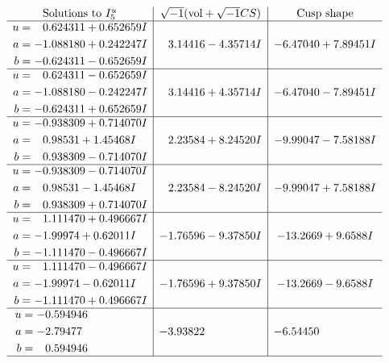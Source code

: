 \documentclass[1p]{elsarticle_modified}
\theoremstyle{definition}
\newcommand{\I}{\sqrt{-1}}
\begin{document}
$$\begin{array}{c|c|c}  
\text{Solutions to }I^u_{5}& \I (\text{vol} + \sqrt{-1}CS) & \text{Cusp shape}\\
 \hline 
\begin{aligned}
u &= \phantom{-}0.624311 + 0.652659 I \\
a &= -1.088180 + 0.242247 I \\
b &= -0.624311 - 0.652659 I\end{aligned}
 & \phantom{-}3.14416 - 4.35714 I & -6.47040 + 7.89451 I \\ \hline\begin{aligned}
u &= \phantom{-}0.624311 - 0.652659 I \\
a &= -1.088180 - 0.242247 I \\
b &= -0.624311 + 0.652659 I\end{aligned}
 & \phantom{-}3.14416 + 4.35714 I & -6.47040 - 7.89451 I \\ \hline\begin{aligned}
u &= -0.938309 + 0.714070 I \\
a &= \phantom{-}0.98531 + 1.45468 I \\
b &= \phantom{-}0.938309 - 0.714070 I\end{aligned}
 & \phantom{-}2.23584 + 8.24520 I & -9.99047 - 7.58188 I \\ \hline\begin{aligned}
u &= -0.938309 - 0.714070 I \\
a &= \phantom{-}0.98531 - 1.45468 I \\
b &= \phantom{-}0.938309 + 0.714070 I\end{aligned}
 & \phantom{-}2.23584 - 8.24520 I & -9.99047 + 7.58188 I \\ \hline\begin{aligned}
u &= \phantom{-}1.111470 + 0.496667 I \\
a &= -1.99974 + 0.62011 I \\
b &= -1.111470 - 0.496667 I\end{aligned}
 & -1.76596 - 9.37850 I & -13.2669 + 9.6588 I \\ \hline\begin{aligned}
u &= \phantom{-}1.111470 - 0.496667 I \\
a &= -1.99974 - 0.62011 I \\
b &= -1.111470 + 0.496667 I\end{aligned}
 & -1.76596 + 9.37850 I & -13.2669 - 9.6588 I \\ \hline\begin{aligned}
u &= -0.594946\phantom{ +0.000000I} \\
a &= -2.79477\phantom{ +0.000000I} \\
b &= \phantom{-}0.594946\phantom{ +0.000000I}\end{aligned}
 & -3.93822\phantom{ +0.000000I} & -6.54450\phantom{ +0.000000I}\\
 \hline 
 \end{array}$$\newpage\newpage\renewcommand{\arraystretch}{1}
\end{document}
